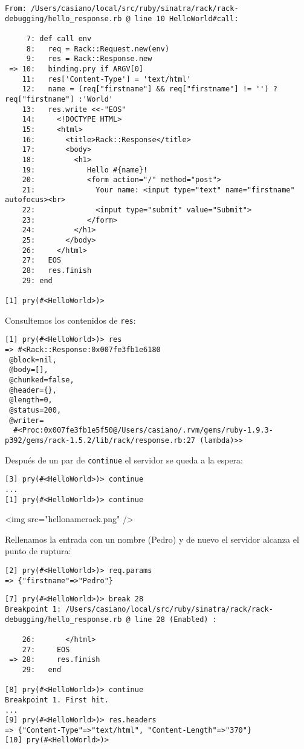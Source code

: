\begin{verbatim}
From: /Users/casiano/local/src/ruby/sinatra/rack/rack-debugging/hello_response.rb @ line 10 HelloWorld#call:

     7: def call env
     8:   req = Rack::Request.new(env)
     9:   res = Rack::Response.new 
 => 10:   binding.pry if ARGV[0]
    11:   res['Content-Type'] = 'text/html'
    12:   name = (req["firstname"] && req["firstname"] != '') ? req["firstname"] :'World'
    13:   res.write <<-"EOS"
    14:     <!DOCTYPE HTML>
    15:     <html>
    16:       <title>Rack::Response</title>
    17:       <body>
    18:         <h1>
    19:            Hello #{name}!
    20:            <form action="/" method="post">
    21:              Your name: <input type="text" name="firstname" autofocus><br>
    22:              <input type="submit" value="Submit">
    23:            </form>
    24:         </h1>
    25:       </body>
    26:     </html>
    27:   EOS
    28:   res.finish
    29: end

[1] pry(#<HelloWorld>)> 
\end{verbatim}
Consultemos los contenidos de \verb|res|:
\begin{verbatim}
[1] pry(#<HelloWorld>)> res
=> #<Rack::Response:0x007fe3fb1e6180
 @block=nil,
 @body=[],
 @chunked=false,
 @header={},
 @length=0,
 @status=200,
 @writer=
  #<Proc:0x007fe3fb1e5f50@/Users/casiano/.rvm/gems/ruby-1.9.3-p392/gems/rack-1.5.2/lib/rack/response.rb:27 (lambda)>>
\end{verbatim}
Después de un par de \verb|continue| el servidor se queda a la espera:
\begin{verbatim}
[3] pry(#<HelloWorld>)> continue
...
[1] pry(#<HelloWorld>)> continue
\end{verbatim}

\begin{rawhtml}
<img src="hellonamerack.png" />
\end{rawhtml}

Rellenamos la entrada con un nombre (Pedro) y de nuevo el servidor alcanza el punto de ruptura:
\begin{verbatim}
[2] pry(#<HelloWorld>)> req.params
=> {"firstname"=>"Pedro"}
\end{verbatim}


\begin{verbatim}
[7] pry(#<HelloWorld>)> break 28
Breakpoint 1: /Users/casiano/local/src/ruby/sinatra/rack/rack-debugging/hello_response.rb @ line 28 (Enabled) :

    26:       </html>
    27:     EOS
 => 28:     res.finish
    29:   end

[8] pry(#<HelloWorld>)> continue
Breakpoint 1. First hit.
...
[9] pry(#<HelloWorld>)> res.headers
=> {"Content-Type"=>"text/html", "Content-Length"=>"370"}
[10] pry(#<HelloWorld>)> 

\end{verbatim}


